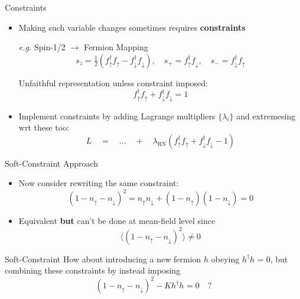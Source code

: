 \documentclass[13pt]{beamer}
\begin{document}
  \begin{frame}{Constraints}

  \begin{itemize}
    \item Making such variable changes sometimes requires \textbf{constraints}
  

  \begin{exampleblock}{\textit{e.g.} Spin-1/2 $ \rightarrow $ Fermion Mapping}
  $$ s_z = \tfrac{1}{2} (f^{\dagger}_{\uparrow} f^{}_{\uparrow} - f^{\dagger}_{\downarrow} f^{}_{\downarrow}), \quad s_{+} = f^{\dagger}_{\uparrow} f^{}_{\downarrow}, \quad s_{-} = f^{\dagger}_{\downarrow} f^{}_{\uparrow} $$

  Unfaithful representation unless constraint imposed: $$ f^{\dagger}_{\uparrow} f^{}_{\uparrow} + f^{\dagger}_{\downarrow} f^{}_{\downarrow} = 1 $$
  \end{exampleblock}

    \item Implement constraints by adding Lagrange multipliers $ \{ \lambda_i \}$ and extremesing wrt these too: $$ L \quad = \quad \ldots \quad + \quad \lambda_{\text{RN}} (f^{\dagger}_{\uparrow} f^{}_{\uparrow} + f^{\dagger}_{\downarrow} f^{}_{\downarrow} - 1) $$

  \end{itemize}
  \end{frame}


  \begin{frame}{Soft-Constraint Approach}

  \begin{itemize}
    \item Now consider rewriting the same constraint: $$ (1 - n_{\uparrow} - n_{\downarrow})^2 = n_{\uparrow} n_{\downarrow} + (1 - n_{\uparrow})(1 - n_{\downarrow}) = 0 $$
    \item Equivalent \textbf{but} can't be done at mean-field level since $$ \langle (1 - n_{\uparrow} - n_{\downarrow})^2 \rangle \neq 0 $$

    \end{itemize}

    \begin{block}{Soft-Constraint}
      How about introducing a new fermion $ h $ obeying $ h^{\dagger} h^{} = 0 $, but combining these constraints by instead imposing $$ (1 - n_{\uparrow} - n_{\downarrow})^2 - K h^{\dagger} h^{} = 0 \quad ? $$
    \end{block}

  \end{frame}
\end{document}
